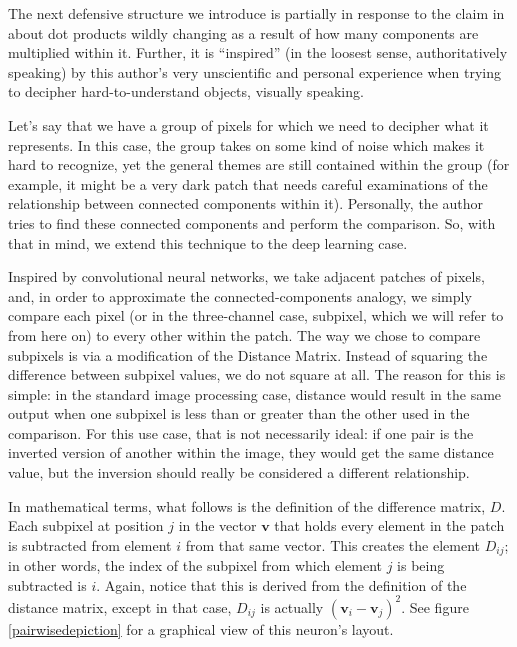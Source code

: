 The next defensive structure we introduce is partially in response to the claim in
\cite{goodfellow2015explaining} about dot products wildly changing as a result of how many
components are multiplied within it. Further, it is ``inspired'' (in the loosest sense,
authoritatively speaking) by this author's very unscientific and personal experience when trying to
decipher hard-to-understand objects, visually speaking.

Let's say that we have a group of pixels for which we need to decipher what it represents. In this
case, the group takes on some kind of noise which makes it hard to recognize, yet the general themes
are still contained within the group (for example, it might be a very dark patch that needs careful
examinations of the relationship between connected components within it). Personally, the author
tries to find these connected components and perform the comparison. So, with that in mind, we
extend this technique to the deep learning case.

Inspired by convolutional neural networks, we take adjacent patches of pixels, and, in order to
approximate the connected-components analogy, we simply compare each pixel (or in the three-channel
case, subpixel, which we will refer to from here on) to every other within the patch. The way we
chose to compare subpixels is via a modification of the Distance Matrix\cite{wikipediadm}. Instead
of squaring the difference between subpixel values, we do not square at all. The reason for this is
simple: in the standard image processing case, distance would result in the same output when one
subpixel is less than or greater than the other used in the comparison. For this use case, that is
not necessarily ideal: if one pair is the inverted version of another within the image, they would
get the same distance value, but the inversion should really be considered a different relationship.

In mathematical terms, what follows is the definition of the difference matrix, $D$. Each subpixel
at position $j$ in the vector $\mathbf{v}$ that holds every element in the patch is subtracted from
element $i$ from that same vector. This creates the element $D_{ij}$; in other words, the index of
the subpixel from which element $j$ is being subtracted is $i$. Again, notice that this is derived
from the definition of the distance matrix, except in that case, $D_{ij}$ is actually $\left(
\mathbf{v}_i - \mathbf{v}_j \right)^2$. See figure \ref{pairwisedepiction} for a graphical view of
this neuron's layout.

